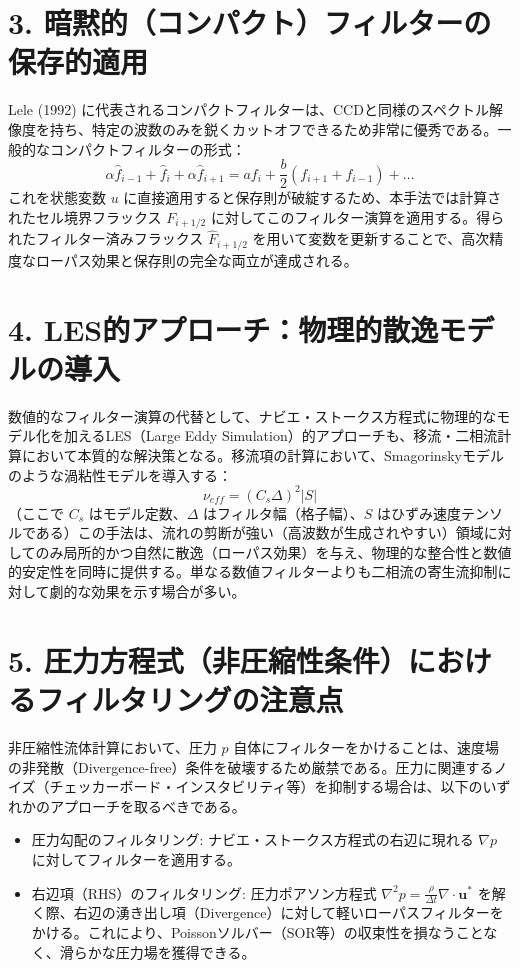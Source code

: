 \documentclass[12pt, a4paper, titlepage]{article}
\begin{document}
\section*{3. 暗黙的（コンパクト）フィルターの保存的適用}
Lele (1992) に代表されるコンパクトフィルターは、CCDと同様のスペクトル解像度を持ち、特定の波数のみを鋭くカットオフできるため非常に優秀である。一般的なコンパクトフィルターの形式：$$\alpha \hat{f}_{i-1} + \hat{f}_i + \alpha \hat{f}_{i+1} = a f_i + \frac{b}{2}(f_{i+1} + f_{i-1}) + \dots$$これを状態変数 $u$ に直接適用すると保存則が破綻するため、本手法では計算されたセル境界フラックス $F_{i+1/2}$ に対してこのフィルター演算を適用する。得られたフィルター済みフラックス $\hat{F}_{i+1/2}$ を用いて変数を更新することで、高次精度なローパス効果と保存則の完全な両立が達成される。

\section*{4. LES的アプローチ：物理的散逸モデルの導入}
数値的なフィルター演算の代替として、ナビエ・ストークス方程式に物理的なモデル化を加えるLES（Large Eddy Simulation）的アプローチも、移流・二相流計算において本質的な解決策となる。移流項の計算において、Smagorinskyモデルのような渦粘性モデルを導入する：$$\nu_{eff} = (C_s \Delta)^2 |S|$$
（ここで $C_s$ はモデル定数、$\Delta$ はフィルタ幅（格子幅）、$S$ はひずみ速度テンソルである）この手法は、流れの剪断が強い（高波数が生成されやすい）領域に対してのみ局所的かつ自然に散逸（ローパス効果）を与え、物理的な整合性と数値的安定性を同時に提供する。単なる数値フィルターよりも二相流の寄生流抑制に対して劇的な効果を示す場合が多い。

\section*{5. 圧力方程式（非圧縮性条件）におけるフィルタリングの注意点}
非圧縮性流体計算において、圧力 $p$ 自体にフィルターをかけることは、速度場の非発散（Divergence-free）条件を破壊するため厳禁である。圧力に関連するノイズ（チェッカーボード・インスタビリティ等）を抑制する場合は、以下のいずれかのアプローチを取るべきである。
\begin{itemize}
    \item 圧力勾配のフィルタリング: ナビエ・ストークス方程式の右辺に現れる $\nabla p$ に対してフィルターを適用する。
    \item 右辺項（RHS）のフィルタリング: 圧力ポアソン方程式 $\nabla^2 p = \frac{\rho}{\Delta t} \nabla \cdot \mathbf{u}^*$ を解く際、右辺の湧き出し項（Divergence）に対して軽いローパスフィルターをかける。これにより、Poissonソルバー（SOR等）の収束性を損なうことなく、滑らかな圧力場を獲得できる。
\end{itemize}
\end{document}
